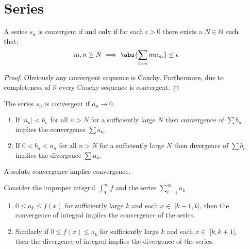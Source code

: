 \thispagestyle{headings}
\chapter{Series}
\begin{theorem}
    A series \(s_n\) is convergent if and only if for each \(\epsilon > 0\) there exists a \(N \in \mathbb{N}\) such that:
    \begin{equation*}
        m,n \geq N \implies \abs{\sum_{i = n}{m}{a_m}} \leq \epsilon
    \end{equation*}
\end{theorem}
\begin{proof}
    Obviously any convergent sequence is Cauchy. Furthermore, due to completeness of \(\mathbb{R}\) every Cauchy sequence is convergent.
\end{proof}
\begin{corollary}
    The series \(s_n\) is convergent if \(a_n \to 0\).
\end{corollary}
\begin{theorem}	\leavevmode
    \begin{enumerate}
        \item
              If \(|a_n| < b_n\) for all \(n > N\) for a sufficiently large \(N\) then convergence of \(\sum{b_n}\) implies the convergence \(\sum{a_n}\).
        \item
              If \(0 < b_n < a_n\) for all \(n > N\) for a sufficiently large \(N\) then divergence of \(\sum{b_n}\) implies the divergence \(\sum{a_n}\).
    \end{enumerate}
\end{theorem}
\begin{corollary}
    Absolute convergence implies convergence.
\end{corollary}
\begin{theorem}
    Consider the improper integral \(\int_{0}^{\infty}{f}\) and the series \(\sum_{i = 1}^{\infty}{a_k}\)
    \begin{enumerate}
        \item \(0 \leq a_k \leq f(x)\) for sufficiently large \(k\) and each \(x \in \; ]k-1, k]\), then the convergence of integral implies the convergence of the series.
        \item Similarly if \(0 \leq f(x) \leq a_k\) for sufficiently large \(k\) and each \(x \in \; [k,k+1[\), then the divergence of integral implies the divergence of the series.
    \end{enumerate}
\end{theorem}
